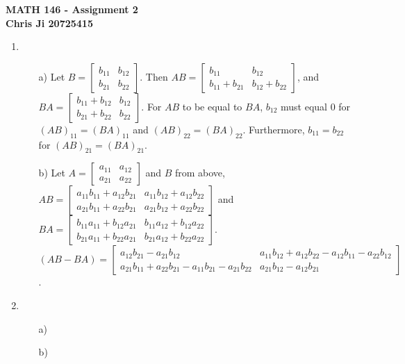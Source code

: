 \documentclass[10pt,english]{article}
\begin{document}
\noindent \begin{center}
\textbf{\large{}MATH 146 - Assignment 2}\\
\textbf{\large{}Chris Ji 20725415}
\par\end{center}{\large \par}
\medskip{}

\begin{enumerate}
\item \begin{enumerate}
    \item [a)] Let $B=\begin{bmatrix}b_{11} & b_{12}\\b_{21} & b_{22}\end{bmatrix}$. Then $AB=\begin{bmatrix}b_{11} & b_{12}\\b_{11}+b_{21} & b_{12}+b_{22}\end{bmatrix}$, and $BA = \begin{bmatrix}b_{11}+b_{12} & b_{12}\\b_{21}+b_{22} & b_{22}\end{bmatrix}$. For $AB$ to be equal to $BA$, $b_{12}$ must equal $0$ for $(AB)_{11}=(BA)_{11}$ and $(AB)_{22}=(BA)_{22}$. Furthermore, $b_{11}=b_{22}$ for $(AB)_{21}=(BA)_{21}$. 
    \item [b)] Let $A=\begin{bmatrix}a_{11} & a_{12}\\a_{21} & a_{22}\end{bmatrix}$ and $B$ from above, $AB=\begin{bmatrix}a_{11}b_{11}+a_{12}b_{21} & a_{11}b_{12}+a_{12}b_{22}\\a_{21}b_{11}+a_{22}b_{21} & a_{21}b_{12}+a_{22}b_{22}\end{bmatrix}$ and $BA=\begin{bmatrix}b_{11}a_{11}+b_{12}a_{21} & b_{11}a_{12}+b_{12}a_{22}\\b_{21}a_{11}+b_{22}a_{21} & b_{21}a_{12}+b_{22}a_{22}\end{bmatrix}$. $(AB-BA)=\begin{bmatrix}a_{12}b_{21}-a_{21}b_{12} & a_{11}b_{12}+a_{12}b_{22}-a_{12}b_{11}-a_{22}b_{12}\\a_{21}b_{11}+a_{22}b_{21}-a_{11}b_{21}-a_{21}b_{22} & a_{21}b_{12}-a_{12}b_{21}\end{bmatrix}$. 
\end{enumerate}

\item \begin{enumerate}
    \item [a)]
    \item [b)]
\end{enumerate}


\end{enumerate}
\end{document}
